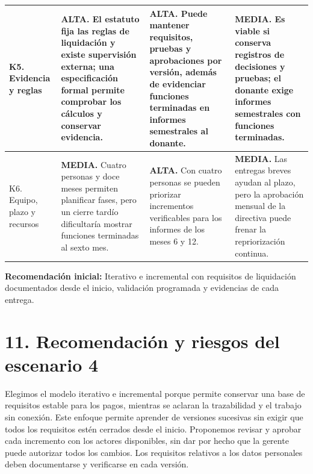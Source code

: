 \documentclass[10pt,letterpaper]{article}
\newcommand{\titulo}[1]{\section*{\textcolor{verde}{#1}}}
\begin{document}
\begin{longtable}{@{}p{3.15cm}p{7.15cm}p{7.15cm}p{7.15cm}@{}}
K5. Evidencia y reglas&\textbf{ALTA.} El estatuto fija las reglas de liquidación y existe supervisión externa; una especificación formal permite comprobar los cálculos y conservar evidencia.&\textbf{ALTA.} Puede mantener requisitos, pruebas y aprobaciones por versión, además de evidenciar funciones terminadas en informes semestrales al donante.&\textbf{MEDIA.} Es viable si conserva registros de decisiones y pruebas; el donante exige informes semestrales con funciones terminadas.\\\hline
K6. Equipo, plazo y recursos&\textbf{MEDIA.} Cuatro personas y doce meses permiten planificar fases, pero un cierre tardío dificultaría mostrar funciones terminadas al sexto mes.&\textbf{ALTA.} Con cuatro personas se pueden priorizar incrementos verificables para los informes de los meses 6 y 12.&\textbf{MEDIA.} Las entregas breves ayudan al plazo, pero la aprobación mensual de la directiva puede frenar la repriorización continua.\\
\end{longtable}
\par
\normalsize
\par
\textbf{Recomendación inicial:} Iterativo e incremental con requisitos de liquidación documentados desde el inicio, validación programada y evidencias de cada entrega.
\par
\titulo{11. Recomendación y riesgos del escenario 4}
\par
Elegimos el modelo iterativo e incremental porque permite conservar una base de requisitos estable para los pagos, mientras se aclaran la trazabilidad y el trabajo sin conexión. Este enfoque permite aprender de versiones sucesivas sin exigir que todos los requisitos estén cerrados desde el inicio. Proponemos revisar y aprobar cada incremento con los actores disponibles, sin dar por hecho que la gerente puede autorizar todos los cambios. Los requisitos relativos a los datos personales deben documentarse y verificarse en cada versión.
\par
\end{document}

